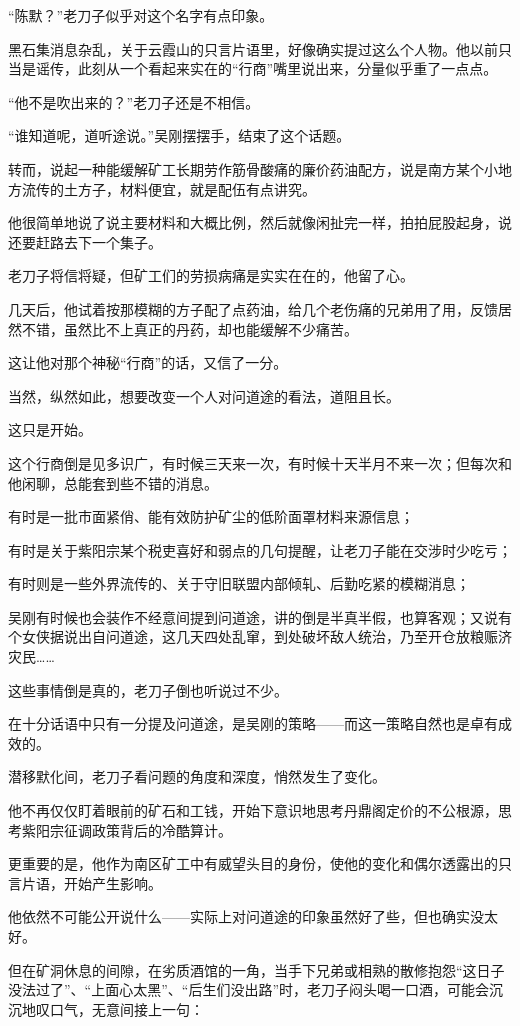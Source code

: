 “陈默？”老刀子似乎对这个名字有点印象。

黑石集消息杂乱，关于云霞山的只言片语里，好像确实提过这么个人物。他以前只当是谣传，此刻从一个看起来实在的“行商”嘴里说出来，分量似乎重了一点点。

“他不是吹出来的？”老刀子还是不相信。

“谁知道呢，道听途说。”吴刚摆摆手，结束了这个话题。

转而，说起一种能缓解矿工长期劳作筋骨酸痛的廉价药油配方，说是南方某个小地方流传的土方子，材料便宜，就是配伍有点讲究。

他很简单地说了说主要材料和大概比例，然后就像闲扯完一样，拍拍屁股起身，说还要赶路去下一个集子。

老刀子将信将疑，但矿工们的劳损病痛是实实在在的，他留了心。

几天后，他试着按那模糊的方子配了点药油，给几个老伤痛的兄弟用了用，反馈居然不错，虽然比不上真正的丹药，却也能缓解不少痛苦。

这让他对那个神秘“行商”的话，又信了一分。

当然，纵然如此，想要改变一个人对问道途的看法，道阻且长。

这只是开始。

这个行商倒是见多识广，有时候三天来一次，有时候十天半月不来一次；但每次和他闲聊，总能套到些不错的消息。

有时是一批市面紧俏、能有效防护矿尘的低阶面罩材料来源信息；

有时是关于紫阳宗某个税吏喜好和弱点的几句提醒，让老刀子能在交涉时少吃亏；

有时则是一些外界流传的、关于守旧联盟内部倾轧、后勤吃紧的模糊消息；

吴刚有时候也会装作不经意间提到问道途，讲的倒是半真半假，也算客观；又说有个女侠据说出自问道途，这几天四处乱窜，到处破坏敌人统治，乃至开仓放粮赈济灾民……

这些事情倒是真的，老刀子倒也听说过不少。

在十分话语中只有一分提及问道途，是吴刚的策略——而这一策略自然也是卓有成效的。

潜移默化间，老刀子看问题的角度和深度，悄然发生了变化。

他不再仅仅盯着眼前的矿石和工钱，开始下意识地思考丹鼎阁定价的不公根源，思考紫阳宗征调政策背后的冷酷算计。

更重要的是，他作为南区矿工中有威望头目的身份，使他的变化和偶尔透露出的只言片语，开始产生影响。

他依然不可能公开说什么——实际上对问道途的印象虽然好了些，但也确实没太好。

但在矿洞休息的间隙，在劣质酒馆的一角，当手下兄弟或相熟的散修抱怨“这日子没法过了”、“上面心太黑”、“后生们没出路”时，老刀子闷头喝一口酒，可能会沉沉地叹口气，无意间接上一句：

